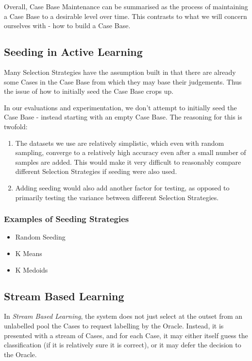 \documentclass[a4paper,11pt]{report}
\begin{document}
Overall, Case Base Maintenance can be summarised as the process of maintaining a Case Base to a desirable level over time. This contrasts to what we will concern ourselves with - how to build a Case Base.

\subsection{Seeding in Active Learning}
Many Selection Strategies have the assumption built in that there are already some Cases in the Case Base from which they may base their judgements. Thus the issue of how to initially seed the Case Base crops up.

In our evaluations and experimentation, we don't attempt to initially seed the Case Base - instead starting with an empty Case Base. The reasoning for this is twofold: 
\begin{enumerate}
	\item The datasets we use are relatively simplistic, which even with random sampling, converge to a relatively high accuracy even after a small number of samples are added. This would make it very difficult to reasonably compare different Selection Strategies if seeding were also used. 
	\item Adding seeding would also add another factor for testing, as opposed to primarily testing the variance between different Selection Strategies.
\end{enumerate}

\subsubsection{Examples of Seeding Strategies}
\begin{itemize}
	\item Random Seeding
	\item K Means
	\item K Medoids
\end{itemize}

\subsection{Stream Based Learning}
In \emph{Stream Based Learning}, the system does not just select at the outset from an unlabelled pool the Cases to request labelling by the Oracle. Instead, it is presented with a stream of Cases, and for each Case, it may either itself guess the classification (if it is relatively sure it is correct), or it may defer the decision to the Oracle.
\end{document}
